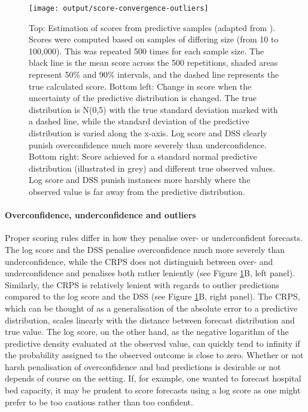 \documentclass[
]{jss}
\begin{document}
\begin{CodeChunk}
\begin{figure}

{\centering \texttt{[image: output/score-convergence-outliers]} 

}

\caption[Top]{Top: Estimation of scores from predictive samples (adapted from \citep{jordanEvaluatingProbabilisticForecasts2019}). Scores were computed based on samples of differing size (from 10 to 100,000). This was repeated 500 times for each sample size. The black line is the mean score across the 500 repetitions, shaded areas represent 50\% and 90\% intervals, and the dashed line represents the true calculated score.  Bottom left: Change in score when the uncertainty of the predictive distribution is changed. The true distribution is N(0,5) with the true standard deviation marked with a dashed line, while the standard deviation of the predictive distribution is varied along the x-axis. Log score and DSS clearly punish overconfidence much more severely than underconfidence. Bottom right: Score achieved for a standard normal predictive distribution (illustrated in grey) and different true observed values. Log score and DSS punish instances more harshly where the observed value is far away from the predictive distribution.}\label{fig:score-convergence}
\end{figure}
\end{CodeChunk}

\hypertarget{overconfidence-underconfidence-and-outliers}{%
\paragraph{Overconfidence, underconfidence and
outliers}\label{overconfidence-underconfidence-and-outliers}}

Proper scoring rules differ in how they penalise over- or underconfident
forecasts. The log score and the DSS penalise overconfidence much more
severely than underconfidence, while the CRPS does not distinguish
between over- and underconfidence and penalises both rather leniently
\citep{macheteContrastingProbabilisticScoring2012} (see Figure
\ref{fig:score-convergence}B, left panel). Similarly, the CRPS is
relatively lenient with regards to outlier predictions compared to the
log score and the DSS (see Figure \ref{fig:score-convergence}B, right
panel). The CRPS, which can be thought of as a generalisation of the
absolute error to a predictive distribution, scales linearly with the
distance between forecast distribution and true value. The log score, on
the other hand, as the negative logarithm of the predictive density
evaluated at the observed value, can quickly tend to infinity if the
probability assigned to the observed outcome is close to zero. Whether
or not harsh penalisation of overconfidence and bad predictions is
desirable or not depends of course on the setting. If, for example, one
wanted to forecast hospital bed capacity, it may be prudent to score
forecasts using a log score as one might prefer to be too cautious
rather than too confident.
\end{document}
